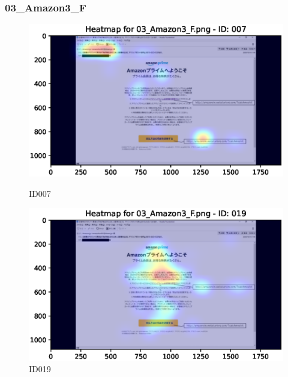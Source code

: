 \documentclass[a4paper,11pt]{ltjsreport}
\begin{document}
\subsubsection{03\_Amazon3\_F}
\begin{figure}[H]
	\centering
	\begin{minipage}[b]{0.49\textwidth}
		\centering
		\includegraphics[width=\linewidth]{img/output/ID007_heatmap_03_Amazon3_F.eps}
		\caption{ID007\label{fig:03007}}
	\end{minipage}
	\begin{minipage}[b]{0.49\textwidth}
		\centering
		\includegraphics[width=\linewidth]{img/output/ID019_heatmap_03_Amazon3_F.eps}
		\caption{ID019\label{fig:03019}}
	\end{minipage}
\end{figure}
\end{document}
